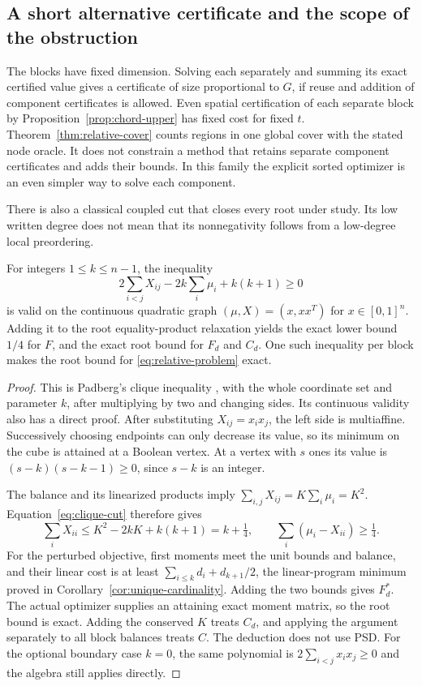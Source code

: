 \subsection{A short alternative certificate and the scope of the obstruction}
The blocks have fixed dimension. Solving each separately and summing its
exact certified value gives a certificate of size proportional to $G$,
if reuse and addition of component certificates is allowed. Even spatial
certification of each separate block by
Proposition~\ref{prop:chord-upper} has fixed cost for fixed $t$.
Theorem~\ref{thm:relative-cover} counts regions in one global cover with
the stated node oracle. It does not constrain a method that retains
separate component certificates and adds their bounds. In this family the
explicit sorted optimizer is an even simpler way to solve each component.

There is also a classical coupled cut that closes every root under study.
Its low written degree does not mean that its nonnegativity follows from
a low-degree local preordering.

\begin{proposition}
\label{prop:clique-escape}
For integers $1\le k\le n-1$, the inequality
\begin{equation}\label{eq:clique-cut}
 2\sum_{i<j}X_{ij}-2k\sum_i\mu_i+k(k+1)\ge0
\end{equation}
is valid on the continuous quadratic graph
$(\mu,X)=(x,xx^T)$ for $x\in[0,1]^n$.
Adding it to the root equality-product relaxation yields the exact lower
bound $1/4$ for $F$, and the exact root bound for $F_d$ and $C_d$.
One such inequality per block makes the root bound for
\eqref{eq:relative-problem} exact.
\end{proposition}
\begin{proof}
This is Padberg's clique inequality
\citep[Lemma 2, equation (17)]{Padberg1989}, with the whole coordinate
set and parameter $k$, after multiplying by two and changing sides.
Its continuous validity also has a direct proof. After substituting
$X_{ij}=x_ix_j$, the left side is multiaffine. Successively choosing
endpoints can only decrease its value, so its minimum on the cube is
attained at a Boolean vertex. At a vertex with $s$ ones its value is
$(s-k)(s-k-1)\ge0$, since $s-k$ is an integer.

The balance and its linearized products imply
$\sum_{i,j}X_{ij}=K\sum_i\mu_i=K^2$.
Equation~\eqref{eq:clique-cut} therefore gives
\[
 \sum_iX_{ii}\le K^2-2kK+k(k+1)=k+\tfrac14,
 \qquad \sum_i(\mu_i-X_{ii})\ge\tfrac14.
\]
For the perturbed objective, first moments meet the unit bounds and
balance, and their linear cost is at least
$\sum_{i\le k}d_i+d_{k+1}/2$, the linear-program minimum proved in
Corollary~\ref{cor:unique-cardinality}. Adding the two bounds gives
$F_d^*$. The actual optimizer supplies an attaining exact moment matrix,
so the root bound is exact. Adding the conserved $K$ treats $C_d$,
and applying the argument separately to all block balances treats $C$.
The deduction does not use PSD. For the optional boundary case $k=0$,
the same polynomial is $2\sum_{i<j}x_ix_j\ge0$ and the algebra still
applies directly.
\end{proof}

